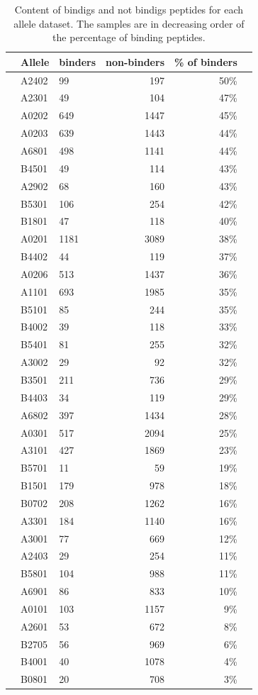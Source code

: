\begin{table}[th]\scriptsize
\begin{center}
\begin{tabular}{rllrrr}
\hline
 & Allele	&	 binders & non-binders & \% of binders \\
\hline
 & A2402	&	99	&	197	&	50\%	\\
 & A2301	&	49	&	104	&	47\%	\\
 & A0202	&	649	&	1447	&	45\%	\\
 & A0203	&	639	&	1443	&	44\%	\\
 & A6801	&	498	&	1141	&	44\%	\\
 & B4501	&	49	&	114	&	43\%	\\
 & A2902	&	68	&	160	&	43\%	\\
 & B5301	&	106	&	254	&	42\%	\\
 & B1801	&	47	&	118	&	40\%	\\
 & A0201	&	1181	&	3089	&	38\%	\\
 & B4402	&	44	&	119	&	37\%	\\
 & A0206	&	513	&	1437	&	36\%	\\
 & A1101	&	693	&	1985	&	35\%	\\
 & B5101	&	85	&	244	&	35\%	\\
 & B4002	&	39	&	118	&	33\%	\\
 & B5401	&	81	&	255	&	32\%	\\
 & A3002	&	29	&	92	&	32\%	\\
 & B3501	&	211	&	736	&	29\%	\\
 & B4403	&	34	&	119	&	29\%	\\
 & A6802	&	397	&	1434	&	28\%	\\
 & A0301	&	517	&	2094	&	25\%	\\
 & A3101	&	427	&	1869	&	23\%	\\
 & B5701	&	11	&	59	&	19\%	\\
 & B1501	&	179	&	978	&	18\%	\\
 & B0702	&	208	&	1262	&	16\%	\\
 & A3301	&	184	&	1140	&	16\%	\\
 & A3001	&	77	&	669	&	12\%	\\
 & A2403	&	29	&	254	&	11\%	\\
 & B5801	&	104	&	988	&	11\%	\\
 & A6901	&	86	&	833	&	10\%	\\
 & A0101	&	103	&	1157	&	9\%	\\
 & A2601	&	53	&	672	&	8\%	\\
 & B2705	&	56	&	969	&	6\%	\\
 & B4001	&	40	&	1078	&	4\%	\\
 & B0801	&	20	&	708	&	3\%	\\
\hline
\end{tabular}
\caption{Content of bindigs and not bindigs peptides for each allele dataset. The samples are in decreasing order of the percentage of binding peptides.}\label{ftable}
\end{center}
\end{table}

